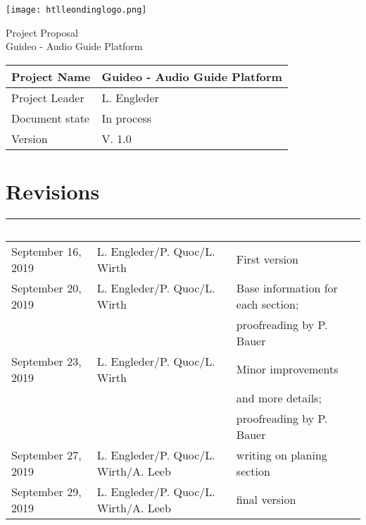 \documentclass[12pt]{article}
\theoremstyle{definition}
\newcommand{\productname}{Guideo - Audio Guide Platform}
\newcommand{\projectleader}{L. Engleder}
\newcommand{\documentstatus}{In process}
\newcommand{\version}{V. 1.0}
\begin{document}
\begin{titlepage}
\begin{flushright}
\texttt{[image: htlleondinglogo.png]}\\
\end{flushright}
 
\vspace{10em}
 
\begin{center}
{\Huge Project Proposal} \\[3em]
{\LARGE \productname} \\[3em]
\end{center}
 
\begin{flushleft}
\begin{tabular}{|l|l|}
\hline
Project Name & \productname \\ \hline
Project Leader & \projectleader \\ \hline
Document state & \documentstatus \\ \hline
Version & \version \\ \hline
\end{tabular}
\end{flushleft}
 
\end{titlepage}
\section*{Revisions}
\begin{tabular}{|l|l|l|}
\hline
\cellcolor[gray]{0.5}\textcolor{white}{Date} & \cellcolor[gray]{0.5}\textcolor{white}{Author} & \cellcolor[gray]{0.5}\textcolor{white}{Change} \\ \hline
September 16, 2019&L. Engleder/P. Quoc/L. Wirth&First version \\ \hline
September 20, 2019&L. Engleder/P. Quoc/L. Wirth& Base information for each section; \\ && proofreading by P. Bauer \\ \hline
September 23, 2019&L. Engleder/P. Quoc/L. Wirth&Minor improvements \\ && and more details;  \\ && proofreading by P. Bauer \\ \hline
September 27, 2019&L. Engleder/P. Quoc/L. Wirth/A. Leeb&writing on planing section \\ \hline
September 29, 2019&L. Engleder/P. Quoc/L. Wirth/A. Leeb&final version \\ \hline
\end{tabular}
\pagebreak
 
\end{document}

